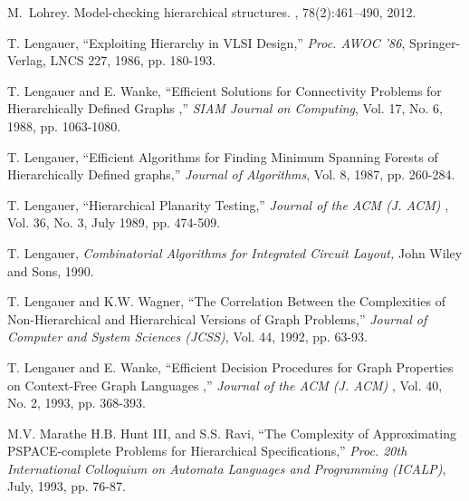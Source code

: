 \begin{thebibliography}{HMRR93}
M.~Lohrey.
\newblock Model-checking hierarchical structures.
, 78(2):461--490, 2012.


\iffalse
\bibitem[LW87b]{LW87b} 
T. Lengauer and  C. Weiner,
``Efficient Solutions Hierarchical Systems of Linear Equations,''  
{\em  Computing}, Vol 39, 1987, pp. 111-132.
\fi




T. Lengauer,
``Exploiting Hierarchy in VLSI Design,''
{\em Proc.  AWOC '86}, 
Springer-Verlag, LNCS 227, 1986, pp. 180-193.
	
T. Lengauer and  E. Wanke,
``Efficient Solutions for Connectivity Problems for Hierarchically  
Defined Graphs ,''
{\em SIAM Journal on Computing}, 
Vol. 17, No. 6, 1988, pp. 1063-1080.




T. Lengauer,
``Efficient Algorithms for Finding Minimum Spanning Forests of 
Hierarchically Defined graphs,''
{\em Journal of Algorithms}, Vol. 8, 1987, pp. 260-284.


T. Lengauer,
``Hierarchical Planarity Testing,''
{\em Journal of the ACM (J. ACM) }, 
Vol. 36, No. 3, July 1989, pp. 474-509.


T. Lengauer,
{\em Combinatorial Algorithms for Integrated Circuit Layout,}
John Wiley and Sons, 1990.


T. Lengauer and  K.W. Wagner,
``The Correlation Between the Complexities of Non-Hierarchical and
Hierarchical Versions of Graph Problems,''
{\em Journal of Computer and System Sciences (JCSS)}, 
Vol. 44,  1992, pp. 63-93. 



T. Lengauer and  E. Wanke,
``Efficient Decision Procedures for Graph Properties on Context-Free 
Graph Languages ,''
{\em Journal of the ACM (J. ACM) }, 
Vol. 40, No. 2, 1993, pp. 368-393.

\iffalse
\bibitem[Li82]{Li82} D. Lichtenstein,
``Planar Formulae and their Uses'', 
{\em SIAM Journal on Computing},
Vol 11, No. 2, May 1982 , pp. 329-343.
\fi

 M.V. Marathe H.B. Hunt III,  and S.S. Ravi,
``The Complexity of Approximating {PSPACE}-complete Problems for 
Hierarchical Specifications,''
{\em Proc. 20th 
International Colloquium on Automata Languages and Programming (ICALP)}, 
July, 1993, pp. 76-87.


\end{thebibliography}
